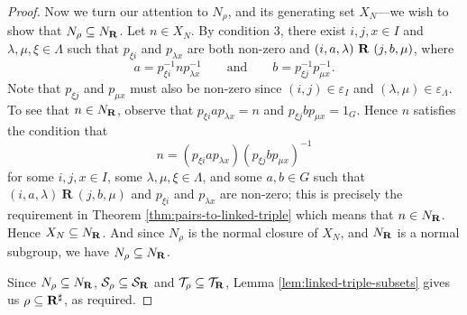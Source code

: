 \begin{theorem}
\begin{proof}
    Now we turn our attention to $N_\rho$, and its generating set $X_N$---we
    wish to show that $N_\rho \subseteq N_{\mathbf{R}}$.  Let $n \in X_N$.  By condition
    3, there exist $i, j, x \in I$ and $\lambda, \mu, \xi \in \Lambda$ such that
    $p_{\xi i}$ and $p_{\lambda x}$ are both non-zero and
    $(i, a, \lambda) ~\mathbf{R}~ (j, b, \mu)$, where
    $$a = p_{\xi i}^{-1} n p_{\lambda x}^{-1} \qquad \text{and} \qquad
    b = p_{\xi j}^{-1} p_{\mu x}^{-1}.$$
    Note that $p_{\xi j}$ and $p_{\mu x}$
    must also be non-zero since $(i, j) \in \varepsilon_I$ and
    $(\lambda, \mu) \in \varepsilon_\Lambda$.  To see that $n \in N_{\mathbf{R}}$, observe
    that $p_{\xi i} a p_{\lambda x} = n$ and $p_{\xi j} b p_{\mu x} = 1_G$.
    Hence $n$ satisfies the condition that
    $$n = (p_{\xi i} a p_{\lambda x}) (p_{\xi j} b p_{\mu x})^{-1}$$
    for some $i,j,x \in I$, some $\lambda, \mu, \xi \in \Lambda$, and some
    $a,b \in G$ such that $(i,a,\lambda) ~\mathbf{R}~ (j,b,\mu)$ and $p_{\xi i}$
    and $p_{\lambda x}$ are non-zero; this is precisely the requirement in
    Theorem \ref{thm:pairs-to-linked-triple} which means that $n \in N_{\mathbf{R}}$.
    Hence $X_N \subseteq N_{\mathbf{R}}$.  And since $N_\rho$ is the normal closure of
    $X_N$, and $N_{\mathbf{R}}$ is a normal subgroup, we have $N_\rho \subseteq N_{\mathbf{R}}$.

    Since $N_\rho \subseteq N_{\mathbf{R}}$, $\mathcal{S}_\rho \subseteq \mathcal{S}_{\mathbf{R}}$ and
    $\mathcal{T}_\rho \subseteq \mathcal{T}_{\mathbf{R}}$, Lemma \ref{lem:linked-triple-subsets} gives us
    $\rho \subseteq \mathbf{R}^\sharp$, as required.
  \end{proof}
\end{theorem}

